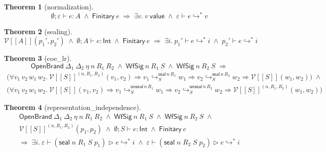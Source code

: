 \documentclass[10pt]{article}
\newtheorem{theorem}{Theorem}[section]
\newcommand{\Int}{\mathsf{Int}}
\newcommand{\tp}{\varepsilon}
\newcommand{\bx}{\mathbin{\triangleright}}
\newcommand{\sealE}[4]{\mathsf{seal}\;#1\;#2\;#3\;#4}
\newcommand{\Val}{\mathsf{value}}
\newcommand{\msteps}[3]{#1 \vdash #2 \hookrightarrow^{*} #3}
\newcommand{\sealv}[5]{#4 \hookrightarrow^{\mathsf{seal}\,#1\,#2}_{#3} #5}
\newcommand{\unsealv}[5]{#4 \hookrightarrow^{\mathsf{unseal}\,#1\,#2}_{#3} #5}
\newcommand{\hast}[4]{#1; #2 \vdash #3 : #4}
\newcommand{\sT}[1]{[\![#1]\!]}
\newcommand{\LRg}[2]{\mathcal{V}\sT{#2}^{#1}}
\newcommand{\LRc}[1]{\mathcal{V}\sT{#1}}
\begin{document}
\begin{theorem}[\textsf{normalization}]
\[
\hast{\emptyset}{\tp}{e}{A} \;\wedge\; \mathsf{Finitary}\ e \;\Longrightarrow\; \exists v.\ v\ \Val \;\wedge\; \msteps{\tp}{e}{v}
\]
\end{theorem}

\begin{theorem}[\textsf{sealing}]
\[
\LRc{A}(p_1',p_2') \;\wedge\; \hast{\emptyset}{A}{e}{\Int} \;\wedge\; \mathsf{Finitary}\ e \;\Longrightarrow\;
\exists i.\ \msteps{p_1'}{e}{i} \;\wedge\; \msteps{p_2'}{e}{i}
\]
\end{theorem}

\begin{theorem}[\textsf{coe\_lr}]
\[
\mathsf{OpenBrand}\ \Delta_1\ \Delta_2\ \eta\ n\ R_1\ R_2 \;\wedge\;
\mathsf{WfSig}\ n\ R_1\ S \;\wedge\; \mathsf{WfSig}\ n\ R_2\ S \;\Longrightarrow
\]
\[
\begin{array}{l}
\bigl(\forall v_1\,v_2\,w_1\,w_2.\
  \LRg{(n,R_1,R_2)}{S}(v_1,v_2) \Rightarrow \sealv{n}{R_1}{S}{v_1}{w_1} \Rightarrow \sealv{n}{R_2}{S}{v_2}{w_2} \Rightarrow \LRc{S}(w_1,w_2)\bigr) \;\wedge \\
\bigl(\forall v_1\,v_2\,w_1\,w_2.\
  \LRc{S}(v_1,v_2) \Rightarrow \unsealv{n}{R_1}{S}{v_1}{w_1} \Rightarrow \unsealv{n}{R_2}{S}{v_2}{w_2} \Rightarrow \LRg{(n,R_1,R_2)}{S}(w_1,w_2)\bigr)
\end{array}
\]
\end{theorem}

\begin{theorem}[\textsf{representation\_independence}]
\[
\begin{array}{l}
\mathsf{OpenBrand}\ \Delta_1\ \Delta_2\ \eta\ n\ R_1\ R_2 \;\wedge\;
\mathsf{WfSig}\ n\ R_1\ S \;\wedge\; \mathsf{WfSig}\ n\ R_2\ S \;\wedge \\
\LRg{(n,R_1,R_2)}{S}(p_1,p_2) \;\wedge\; \hast{\emptyset}{S}{e}{\Int} \;\wedge\; \mathsf{Finitary}\ e \\
\Longrightarrow\;
\exists i.\ \msteps{\tp}{(\sealE{n}{R_1}{S}{p_1}) \bx e}{i} \;\wedge\; \msteps{\tp}{(\sealE{n}{R_2}{S}{p_2}) \bx e}{i}
\end{array}
\]
\end{theorem}
\end{document}
